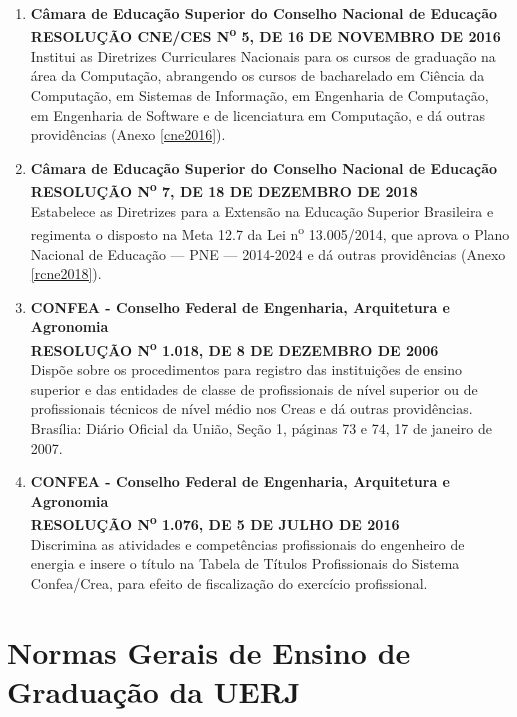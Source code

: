 \begin{enumerate}
    \item \textbf{Câmara de Educação Superior do Conselho Nacional de Educação}  \\
          \textbf{RESOLUÇÃO CNE/CES N\textsuperscript{o} 5, DE 16 DE NOVEMBRO DE 2016}  \\
          Institui as Diretrizes Curriculares Nacionais para os cursos de graduação na área da Computação, abrangendo os cursos de bacharelado em Ciência da Computação, em Sistemas de Informação, em Engenharia de Computação, em Engenharia de Software e de licenciatura em Computação, e dá outras providências (Anexo \ref{cne2016}).

    \item \textbf{Câmara de Educação Superior do Conselho Nacional de Educação}  \\
          \textbf{RESOLUÇÃO N\textsuperscript{o} 7, DE 18 DE DEZEMBRO DE 2018}  \\
          Estabelece as Diretrizes para a Extensão na Educação Superior Brasileira e regimenta o disposto na Meta 12.7 da Lei n\textsuperscript{o} 13.005/2014, que aprova o Plano Nacional de Educação –-- PNE –-- 2014-2024 e dá outras providências (Anexo \ref{rcne2018}).

    \item \textbf{CONFEA - Conselho Federal de Engenharia, Arquitetura e Agronomia}  \\
          \textbf{RESOLUÇÃO N\textsuperscript{o} 1.018, DE 8 DE DEZEMBRO DE 2006}  \\
          Dispõe sobre os procedimentos para registro das instituições de ensino superior e das entidades de classe de profissionais de nível superior ou de profissionais técnicos de nível médio nos Creas e dá outras providências. Brasília: Diário Oficial da União, Seção 1, páginas 73 e 74, 17 de janeiro de 2007.

    \item \textbf{CONFEA - Conselho Federal de Engenharia, Arquitetura e Agronomia}  \\
          \textbf{RESOLUÇÃO N\textsuperscript{o} 1.076, DE 5 DE JULHO DE 2016}  \\
          Discrimina as atividades e competências profissionais do engenheiro de energia e insere o título na Tabela de Títulos Profissionais do Sistema Confea/Crea, para efeito de fiscalização do exercício profissional.
\end{enumerate}

\section{Normas Gerais de Ensino de Graduação da UERJ}

